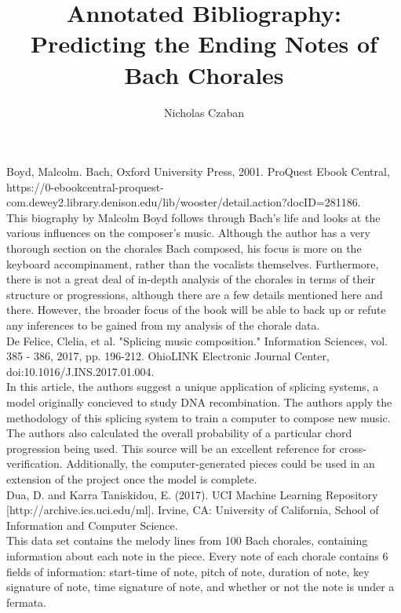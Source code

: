 \documentclass[12pt]{article}
\begin{document}
\title{Annotated Bibliography: Predicting the Ending Notes of Bach Chorales}
\author{Nicholas Czaban}
\maketitle

\noindent \hangindent=0.7cm Boyd, Malcolm. Bach, Oxford University Press, 2001. ProQuest Ebook Central, https://0-ebookcentral-proquest-com.dewey2.library.denison.edu/lib/wooster/detail.action?docID=281186.\\

This biography by Malcolm Boyd follows through Bach's life and looks at the various influences on the composer's music. Although the author has a very thorough section on the chorales Bach composed, his focus is more on the keyboard accompinament, rather than the vocalists themselves. Furthermore, there is not a great deal of in-depth analysis of the chorales in terms of their structure or progressions, although there are a few details mentioned here and there. However, the broader focus of the book will be able to back up or refute any inferences to be gained from my analysis of the chorale data.\\

\noindent \hangindent=0.7cm De Felice, Clelia, et al. "Splicing music composition." Information Sciences, vol. 385 - 386, 2017, pp. 196-212. OhioLINK Electronic Journal Center, doi:10.1016/J.INS.2017.01.004.\\

In this article, the authors suggest a unique application of splicing systems, a model originally concieved to study DNA recombination. The authors apply the methodology of this splicing system to train a computer to compose new music. The authors also calculated the overall probability of a particular chord progression being used. This source will be an excellent reference for cross-verification. Additionally, the computer-generated pieces could be used in an extension of the project once the model is complete.\\

\noindent \hangindent=0.7cm Dua, D. and Karra Taniskidou, E. (2017). UCI Machine Learning Repository [http://archive.ics.uci.edu/ml]. Irvine, CA: University of California, School of Information and Computer Science.\\

This data set contains the melody lines from 100 Bach chorales, containing information about each note in the piece. Every note of each chorale contains 6 fields of information: start-time of note, pitch of note, duration of note, key signature of note, time signature of note, and whether or not the note is under a fermata.\\
\end{document}
